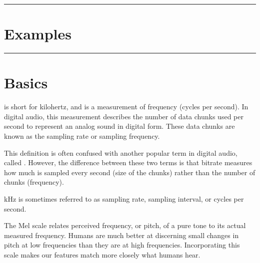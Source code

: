 \documentclass[letterpaper,10pt,english]{sphinxmanual}
\begin{document}
\bigskip\hrule\bigskip



\chapter{Examples}
\label{\detokenize{about:examples}}\label{\detokenize{about:examples}}

\bigskip\hrule\bigskip



\chapter{Basics}
\label{\detokenize{AudioBasics:basics}}\label{\detokenize{AudioBasics:basics}}\label{\detokenize{AudioBasics::doc}}

 is short for kilohertz, and is a measurement of frequency (cycles per second).
In digital audio, this measurement describes the number of data chunks used per second to represent an analog sound in digital form. These data chunks are known as the sampling rate or sampling frequency.

This definition is often confused with another popular term in digital audio,
called . However, the difference between these two terms is that bitrate measures how much is sampled every second (size of the chunks) rather than the number of chunks (frequency).

 kHz is sometimes referred to as sampling rate, sampling interval, or cycles per second.


The Mel scale relates perceived frequency, or pitch, of a pure tone to its actual measured frequency. Humans are much better at discerning small changes in pitch at low frequencies than they are at high frequencies. Incorporating this scale makes our features match more closely what humans hear.
\end{document}
